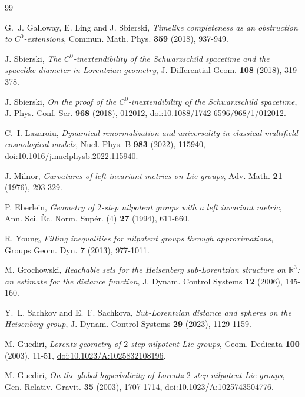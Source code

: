 \documentclass[10pt,a4paper]{article}
\numberwithin{equation}{section}
\theoremstyle{definition}
\theoremstyle{remark}
\begin{document}
\begin{thebibliography}{99}

\raggedright

G.~J. Galloway, E. Ling and J. Sbierski,
\emph{Timelike completeness as an obstruction to $C^0$-extensions},
Commun. Math. Phys. \textbf{359} (2018), 937-949.

J. Sbierski,
\emph{The $C^0$-inextendibility of the Schwarzschild spacetime and the
spacelike diameter in Lorentzian geometry},
J. Differential Geom. \textbf{108} (2018), 319-378.

J. Sbierski,
\emph{On the proof of the $C^0$-inextendibility of the Schwarzschild spacetime},
J. Phys. Conf. Ser. \textbf{968} (2018), 012012,
\href{https://doi.org/10.1088/1742-6596/968/1/012012}
{doi:10.1088/1742-6596/968/1/012012}.

C.~I. Lazaroiu,
\emph{Dynamical renormalization and universality in classical multifield
cosmological models}, Nucl. Phys. B \textbf{983} (2022), 115940,
\href{https://doi.org/10.1016/j.nuclphysb.2022.115940}
{doi:10.1016/j.nuclphysb.2022.115940}.

J. Milnor,
\emph{Curvatures of left invariant metrics on Lie groups},
Adv. Math. \textbf{21} (1976), 293-329.

P. Eberlein,
\emph{Geometry of $2$-step nilpotent groups with a left invariant metric},
Ann. Sci. \`Ec. Norm. Sup\'er. (4) \textbf{27} (1994), 611-660.

R. Young,
\emph{Filling inequalities for nilpotent groups through approximations},
Groups Geom. Dyn. \textbf{7} (2013), 977-1011.

M. Grochowski,
\emph{Reachable sets for the Heisenberg sub-Lorentzian structure on
$\mathbb R^3$: an estimate for the distance function},
J. Dynam. Control Systems \textbf{12} (2006), 145-160.

Y.~L. Sachkov and E.~F. Sachkova,
\emph{Sub-Lorentzian distance and spheres on the Heisenberg group},
J. Dynam. Control Systems \textbf{29} (2023), 1129-1159.

M. Guediri,
\emph{Lorentz geometry of $2$-step nilpotent Lie groups},
Geom. Dedicata \textbf{100} (2003), 11-51,
\href{https://doi.org/10.1023/A:1025832108196}
{doi:10.1023/A:1025832108196}.

M. Guediri,
\emph{On the global hyperbolicity of Lorentz $2$-step nilpotent Lie groups},
Gen. Relativ. Gravit. \textbf{35} (2003), 1707-1714,
\href{https://doi.org/10.1023/A:1025743504776}
{doi:10.1023/A:1025743504776}.


\end{thebibliography}
\end{document}
